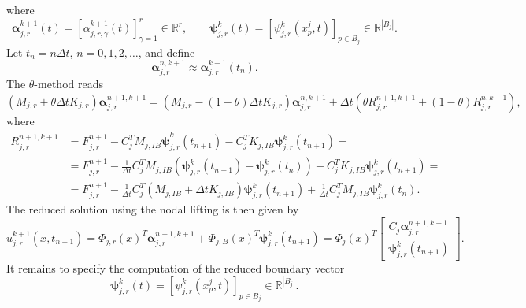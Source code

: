 \documentclass[a4paper, 11pt]{article}
\theoremstyle{remark}
\begin{document}
where
\begin{equation*}
    \boldsymbol{\alpha}_{j, r}^{k+1}(t) = [\alpha_{j, r, \gamma}^{k+1}(t)]_{\gamma = 1}^{r}\in\mathbb{R}^{r}, \qquad \boldsymbol{\psi}_{j, r}^{k}(t) = [\psi_{j, r}^{k}(x^{j}_{p}, t)]_{p\in B_{j}}\in\mathbb{R}^{|B_{j}|}.
\end{equation*}
Let $t_n = n \Delta t$, $n=0,1,2,\dots$, and define
\begin{equation*}
    \boldsymbol{\alpha}_{j, r}^{n, k+1} \approx \boldsymbol{\alpha}_{j, r}^{k+1}(t_n).    
\end{equation*}
The $\theta$-method reads
\begin{equation*}
    \left(M_{j, r} + \theta\Delta t K_{j, r}\right) \boldsymbol{\alpha}_{j, r}^{n+1, k+1} = \left(M_{j, r} - (1-\theta)\Delta t K_{j, r}\right)\boldsymbol{\alpha}_{j, r}^{n, k+1} + \Delta t\left(\theta R^{n+1, k+1}_{j, r} + (1-\theta)R^{n, k+1}_{j, r}\right),
\end{equation*}
where
\begin{align*}
    R^{n+1, k+1}_{j, r} &= F^{n+1}_{j, r} - C_{j}^{T}M_{j, IB}\boldsymbol{\dot{\psi}}_{j,r}^{k}(t_{n+1}) - C_{j}^{T}K_{j, IB}\boldsymbol{\psi}_{j, r}^{k}(t_{n+1}) =\\
    &=F^{n+1}_{j, r} - \frac{1}{\Delta t}C_{j}^{T}M_{j, IB}\left(\boldsymbol{\psi}_{j, r}^{k}(t_{n+1}) - \boldsymbol{\psi}_{j, r}^{k}(t_{n})\right) - C_{j}^{T}K_{j, IB}\boldsymbol{\psi}_{j, r}^{k}(t_{n+1}) =\\
    &= F^{n+1}_{j, r} - \frac{1}{\Delta t}C_{j}^{T}\left(M_{j, IB} +\Delta t K_{j, IB}\right)\boldsymbol{\psi}_{j, r}^{k}(t_{n+1}) + \frac{1}{\Delta t}C_{j}^{T}M_{j, IB}\boldsymbol{\psi}_{j, r}^{k}(t_{n}).
\end{align*}
The reduced solution using the nodal lifting is then given by
\begin{equation*}
    u^{k+1}_{j, r}(x, t_{n+1}) = \Phi_{j, r}(x)^{T}\boldsymbol{\alpha}_{j, r}^{n+1, k+1} + \Phi_{j, B}(x)^{T}\boldsymbol{\psi}_{j, r}^{k}(t_{n+1}) = \Phi_{j}(x)^{T}
    \begin{bmatrix}
        C_{j}\boldsymbol{\alpha}_{j, r}^{n+1, k+1}\\
        \boldsymbol{\psi}_{j, r}^{k}(t_{n+1})
    \end{bmatrix}.
\end{equation*}
It remains to specify the computation of the reduced boundary vector
\begin{equation*}
    \boldsymbol{\psi}_{j, r}^{k}(t) = [\psi_{j, r}^{k}(x^{j}_{p}, t)]_{p\in B_{j}}\in\mathbb{R}^{|B_{j}|}.
\end{equation*}
\end{document}
